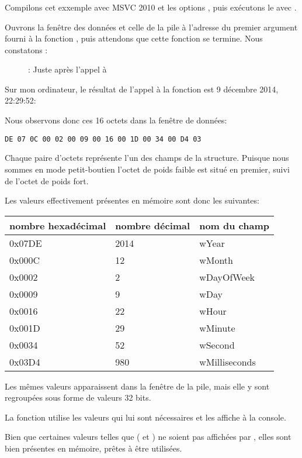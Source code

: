 ﻿\clearpage
\subsubsection{\olly}
\myindex{\olly}

Compilons cet exxemple avec MSVC 2010 et les options , puis exécutons le avec \olly.

Ouvrons la fenêtre des données et celle de la pile à l'adresse du premier argument fourni à la 
fonction , puis attendons que cette fonction se termine. Nous constatons :

\begin{figure}[H]
\centering
{}
\caption{\olly: Juste après l'appel à }
\label{fig:struct_olly_1}
\end{figure}

Sur mon ordinateur, le résultat de l'appel à la fonction est 9 décembre 2014, 22:29:52:



Nous observons donc ces 16 octets dans la fenêtre de données:
\begin{lstlisting}
DE 07 0C 00 02 00 09 00 16 00 1D 00 34 00 D4 03
\end{lstlisting}

Chaque paire d'octets représente l'un des champs de la structure. 
Puisque nous sommes en mode petit-boutien l'octet de poids faible est situé en premier, suivi de 
l'octet de poids fort.

Les valeurs effectivement présentes en mémoire sont donc les suivantes:

\begin{center}
\begin{tabular}{ | l | l | l | }
\hline
\headercolor{} nombre hexadécimal & 
\headercolor{} nombre décimal & 
\headercolor{} nom du champ \\
\hline
0x07DE & 2014	& wYear \\
\hline
0x000C & 12	& wMonth \\
\hline
0x0002 & 2	& wDayOfWeek \\
\hline
0x0009 & 9	& wDay \\
\hline
0x0016 & 22	& wHour \\
\hline
0x001D & 29	& wMinute \\
\hline
0x0034 & 52	& wSecond \\
\hline	
0x03D4 & 980	& wMilliseconds \\
\hline
\end{tabular}
\end{center}

Les mêmes valeurs apparaissent dans la fenêtre de la pile, mais elle y sont regroupées sous forme 
de valeurs 32 bits.

La fonction \printf utilise les valeurs qui lui sont nécessaires et les affiche à la console.

Bien que certaines valeurs telles que ( et ) ne soient pas 
affichées par \printf, elles sont bien présentes en mémoire, prêtes à être utilisées.
